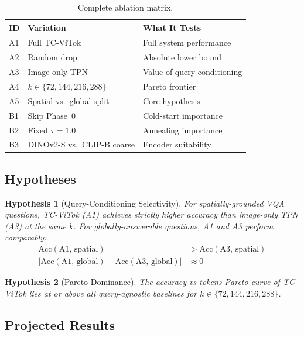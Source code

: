 \documentclass[11pt,a4paper]{article}
\newtheorem{hypothesis}{Hypothesis}
\begin{document}
\begin{table}[h]
\centering
\caption{Complete ablation matrix.}
\label{tab:ablations}
\renewcommand{\arraystretch}{1.15}
\small
\begin{tabular}{@{}llp{5.5cm}@{}}
  \toprule
  ID & Variation & What It Tests \\
  \midrule
  A1 & Full TC-ViTok & Full system performance \\
  A2 & Random drop & Absolute lower bound \\
  A3 & Image-only TPN & Value of query-conditioning \\
  A4 & $k \in \{72,144,216,288\}$ & Pareto frontier \\
  A5 & Spatial vs.\ global split & Core hypothesis \\
  \midrule
  B1 & Skip Phase~0 & Cold-start importance \\
  B2 & Fixed $\tau{=}1.0$ & Annealing importance \\
  B3 & DINOv2-S vs.\ CLIP-B coarse & Encoder suitability \\
  \bottomrule
\end{tabular}
\end{table}

\subsection{Hypotheses}

\begin{hypothesis}[Query-Conditioning Selectivity]
  \label{hyp:main}
  For spatially-grounded VQA questions, TC-ViTok (A1) achieves strictly
  higher accuracy than image-only TPN (A3) at the same $k$. For
  globally-answerable questions, A1 and A3 perform comparably:
  \begin{align}
    \text{Acc}(\text{A1},\,\text{spatial})
      &> \text{Acc}(\text{A3},\,\text{spatial}) \\
    |\text{Acc}(\text{A1},\,\text{global})
      - \text{Acc}(\text{A3},\,\text{global})|
      &\approx 0
  \end{align}
\end{hypothesis}

\begin{hypothesis}[Pareto Dominance]
  \label{hyp:pareto}
  The accuracy-vs-tokens Pareto curve of TC-ViTok lies at or above all
  query-agnostic baselines for $k \in \{72, 144, 216, 288\}$.
\end{hypothesis}

\subsection{Projected Results}
\end{document}
